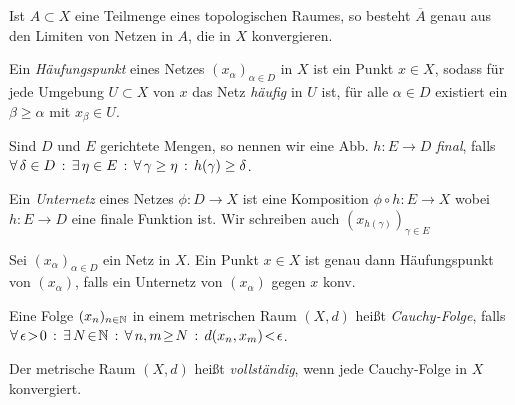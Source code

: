 \documentclass{cheat-sheet}
\begin{document}
\begin{prop}
  Ist $A \subset X$ eine Teilmenge eines topologischen Raumes, so besteht $\overline{A}$ genau aus den Limiten von Netzen in $A$, die in $X$ konvergieren.
\end{prop}

\begin{defn}
  Ein \emph{Häufungspunkt} eines Netzes $(x_\alpha)_{\alpha \in D}$ in $X$ ist ein Punkt $x \in X$, sodass für jede Umgebung $U \subset X$ von $x$ das Netz \emph{häufig} in $U$ ist, \dh{} für alle $\alpha \in D$ existiert ein $\beta \geq \alpha$ mit $x_\beta \in U$.
\end{defn}

\begin{defn}
  Sind $D$ und $E$ gerichtete Mengen, so nennen wir eine Abb. $h : E \to D$ \emph{final}, falls
  $\forall \, {\delta \in D} \,:\, \exists \, {\eta \in E} \,:\, \forall \, {\gamma \geq \eta} \,:\, h(\gamma) \geq \delta$.
\end{defn}

\begin{defn}
  Ein \emph{Unternetz} eines Netzes $\phi : D \to X$ ist eine Komposition $\phi \circ h : E \to X$ wobei $h : E \to D$ eine finale Funktion ist. Wir schreiben auch $(x_{h(\gamma)})_{\gamma \in E}$
\end{defn}


\begin{prop}
  Sei $(x_\alpha)_{\alpha \in D}$ ein Netz in $X$. Ein Punkt $x \in X$ ist genau dann Häufungspunkt von $(x_\alpha)$, falls ein Unternetz von $(x_\alpha)$ gegen $x$ konv.
\end{prop}


\begin{defn}
  Eine Folge $(x_n)_{n \in \mathbb{N}}$ in einem metrischen Raum $(X, d)$ heißt \emph{Cauchy-Folge}, falls
  $\fa{\epsilon \!>\! 0} \ex{N \!\in\! \N} \fa{n, m \!\geq\! N} d(x_n, x_m) \!<\! \epsilon$.
\end{defn}

\begin{defn}
  Der metrische Raum $(X, d)$ heißt \emph{vollständig}, wenn jede Cauchy-Folge in $X$ konvergiert.
\end{defn}
\end{document}
